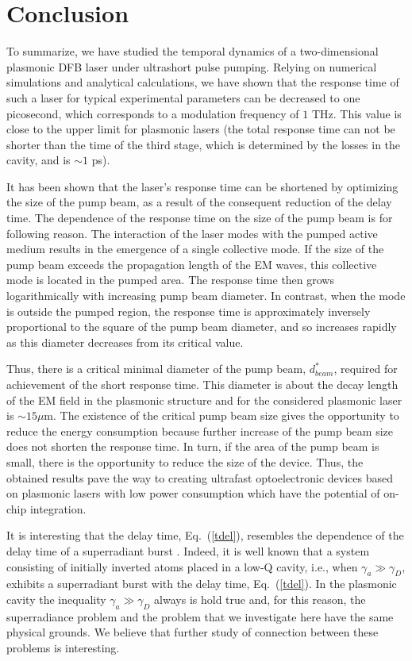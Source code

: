 \documentclass[aps,pra,amsmath,amssymb,onecolumn,superscriptaddress,showpacs,floatfix,]{revtex4-1}
\begin{document}
\section*{Conclusion}

To summarize, we have studied the temporal dynamics of a two-dimensional plasmonic DFB laser under ultrashort pulse pumping.
Relying on numerical simulations and analytical calculations, we have shown that the response time of such a laser for typical experimental parameters can be decreased to one picosecond, which corresponds to a modulation frequency of $1$ THz.
This value is close to the upper limit for plasmonic lasers (the total response time can not be shorter than the time of the third stage, which is determined by the losses in the cavity, and is $ \sim 1$ ps).

It has been shown that the laser's response time can be shortened by optimizing the size of the pump beam, as a result of the consequent reduction of the delay time.
The dependence of the response time on the size of the pump beam is for following reason.
The interaction of the laser modes with the pumped active medium results in the emergence of a single collective mode.
If the size of the pump beam exceeds the propagation length of the EM waves, this collective mode is located in the pumped area.
The response time then grows logarithmically with increasing pump beam diameter.
In contrast, when the mode is outside the pumped region, the response time is approximately inversely proportional to the square of the pump beam diameter, and so increases rapidly as this diameter decreases from its critical value.

Thus, there is a critical minimal diameter of the pump beam, $d_{beam}^*$, required for achievement of the short response time. This diameter is about the decay length of the EM field in the plasmonic structure and for the considered plasmonic laser is $\sim 15 \mu$m. The existence of the critical pump beam size gives the opportunity to reduce the energy consumption because further increase of the pump beam size does not shorten the response time.
In turn, if the area of the pump beam is small, there is the opportunity to reduce the size of the device.
Thus, the obtained results pave the way to creating ultrafast optoelectronic devices based on plasmonic lasers with low power consumption which have the potential of on-chip integration.

It is interesting that the delay time, Eq.~(\ref{tdel}), resembles the dependence of the delay time of a superradiant burst \cite{gross1982superradiance, andreev1980collective,nefedkin2017badcavitySR}.
Indeed, it is well known \cite{gross1982superradiance, andreev1980collective} that a system consisting of initially inverted atoms placed in a low-Q cavity, i.e., when $\gamma_a \gg \gamma_D$, exhibits a superradiant burst with the delay time, Eq.~(\ref{tdel}). In the plasmonic cavity the inequality $\gamma_a \gg \gamma_D$ always is hold true and, for this reason, the superradiance problem and the problem that we investigate here have the same physical grounds. We believe that further study of connection between these problems is interesting.
\end{document}
